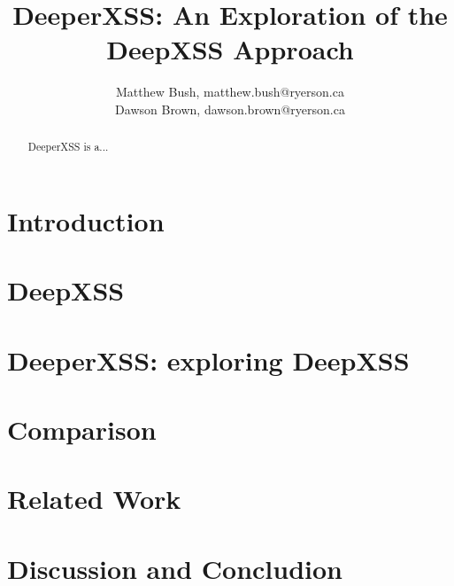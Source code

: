 \documentclass{llncs}
\title{DeeperXSS: An Exploration of the DeepXSS Approach}
\author{Matthew Bush, matthew.bush@ryerson.ca\\Dawson Brown, dawson.brown@ryerson.ca}
\institute{Ryerson University}
\date{}
\begin{document}
\maketitle
\pagestyle{plain}

\begin{abstract}
DeeperXSS is a...

\end{abstract}


\section{Introduction}



\section{DeepXSS}



\section{DeeperXSS: exploring DeepXSS}



\section{Comparison}



\section{Related Work}



\section{Discussion and Concludion}



\newpage


\end{document}
